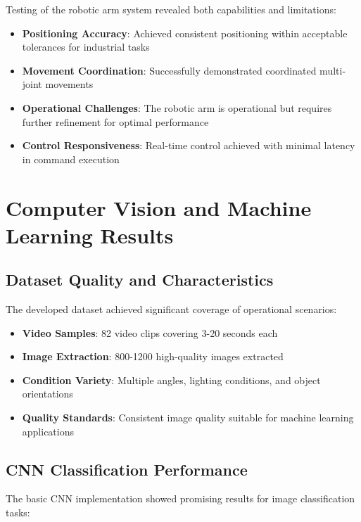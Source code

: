 \documentclass{book}
\begin{document}
\par\noindent Testing of the robotic arm system revealed both capabilities and limitations:

\begin{itemize}
\item \textbf{Positioning Accuracy}: Achieved consistent positioning within acceptable tolerances for industrial tasks
\item \textbf{Movement Coordination}: Successfully demonstrated coordinated multi-joint movements
\item \textbf{Operational Challenges}: The robotic arm is operational but requires further refinement for optimal performance
\item \textbf{Control Responsiveness}: Real-time control achieved with minimal latency in command execution
\end{itemize}

\section{Computer Vision and Machine Learning Results}

\subsection{Dataset Quality and Characteristics}

\par\noindent The developed dataset achieved significant coverage of operational scenarios:

\begin{itemize}
\item \textbf{Video Samples}: 82 video clips covering 3-20 seconds each
\item \textbf{Image Extraction}: 800-1200 high-quality images extracted
\item \textbf{Condition Variety}: Multiple angles, lighting conditions, and object orientations
\item \textbf{Quality Standards}: Consistent image quality suitable for machine learning applications
\end{itemize}

\subsection{CNN Classification Performance}

\par\noindent The basic CNN implementation showed promising results for image classification tasks:
\end{document}
